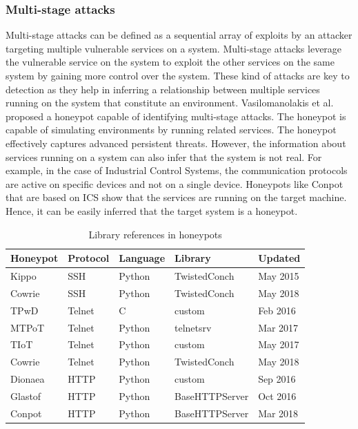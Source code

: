 \documentclass[letterpaper, 10 pt, conference]{ieeeconf}  %
\begin{document}
\subsubsection{Multi-stage attacks}
Multi-stage attacks can be defined as a sequential array of exploits by an attacker targeting multiple vulnerable services on a system. Multi-stage attacks leverage the vulnerable service on the system to exploit the other services on the same system by gaining more control over the system. These kind of attacks are key to detection as they help in inferring a relationship between multiple services running on the system that constitute an environment. Vasilomanolakis et al. \cite{vasilomanolakis} proposed a honeypot capable of identifying multi-stage attacks. The honeypot is capable of simulating environments by running related services. The honeypot effectively captures advanced persistent threats. However, the information about services running on a system can also infer that the system is not real. For example, in the case of Industrial Control Systems, the communication protocols are active on specific devices and not on a single device. Honeypots like Conpot that are based on ICS show that the services are running on the target machine. Hence, it can be easily inferred that the target system is a honeypot. 
\newline

\begin{table}[ht!]
 \begin{tabular}{|l|l|l|l|l|} 
 \hline
 Honeypot & Protocol & Language & Library & Updated \\ [0.3ex] 
 \hline
 Kippo  & SSH    & Python &  TwistedConch & May 2015 \\ 
 Cowrie & SSH    & Python &  TwistedConch & May 2018 \\
 TPwD   & Telnet & C      &  custom       & Feb 2016 \\
 MTPoT  & Telnet & Python &  telnetsrv    & Mar 2017 \\
 TIoT   & Telnet & Python &  custom       & May 2017 \\
 Cowrie & Telnet & Python &  TwistedConch & May 2018 \\
 Dionaea& HTTP   & Python &  custom       & Sep 2016 \\
 Glastof& HTTP   & Python &  BaseHTTPServer& Oct 2016 \\
 Conpot & HTTP   & Python &  BaseHTTPServer& Mar 2018 \\ [1ex] 
 \hline
\end{tabular}
 \caption{Library references in honeypots}
\label{table:2}
\end{table}
\end{document}
